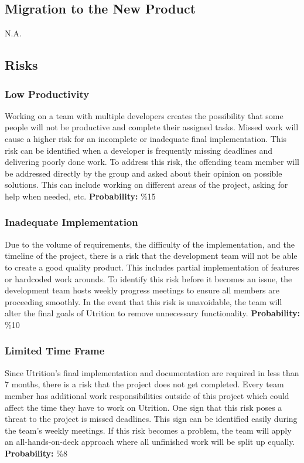 \documentclass[12pt]{article}
\begin{document}
\subsection{Migration to the New Product}
N.A.

\subsection{Risks}
\subsubsection{Low Productivity}
Working on a team with multiple developers creates the possibility that some people will not be productive and complete their assigned tasks. Missed work will cause a higher risk for an incomplete or inadequate final implementation. This risk can be identified when a developer is frequently missing deadlines and delivering poorly done work. To address this risk, the offending team member will be addressed directly by the group and asked about their opinion on possible solutions. This can include working on different areas of the project, asking for help when needed, etc.\newline
\textbf{Probability:} \%15

\subsubsection{Inadequate Implementation}
Due to the volume of requirements, the difficulty of the implementation, and the timeline of the project, there is a risk that the development team will not be able to create a good quality product. This includes partial implementation of features or hardcoded work arounds. To identify this risk before it becomes an issue, the development team hosts weekly progress meetings to ensure all members are proceeding smoothly. In the event that this risk is unavoidable, the team will alter the final goals of Utrition to remove unnecessary functionality.\newline
\textbf{Probability:} \%10

\subsubsection{Limited Time Frame}
Since Utrition's final implementation and documentation are required in less than 7 months, there is a risk that the project does not get completed. Every team member has additional work responsibilities outside of this project which could affect the time they have to work on Utrition. One sign that this risk poses a threat to the project is missed deadlines. This sign can be identified easily during the team's weekly meetings. If this risk becomes a problem, the team will apply an all-hands-on-deck approach where all unfinished work will be split up equally.\newline
\textbf{Probability:} \%8
\end{document}

